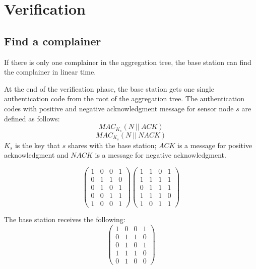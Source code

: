 \chapter{Verification}

\section{Find a complainer}

	If there is only one complainer in the aggregation tree, the base station can find the complainer in linear time.
	
	At the end of the verification phase, the base station gets one single authentication code from the root of the aggregation tree.
	The authentication codes with positive and negative acknowledgment message for sensor node $s$ are defined as follows:
	\begin{equation}
		MAC_{K_{s}}(N\ ||\ ACK)
	\end{equation}
	\begin{equation}
		MAC_{K_{s}}(N\ ||\ NACK)
	\end{equation}
	$K_{s}$ is the key that $s$ shares with the base station;
	$ACK$ is a message for positive acknowledgment and
	$NACK$ is a message for negative acknowledgment.

	\[ 
		\left( 
			\begin{array}{cccc}
				1 & 0 & 0 & 1 \\ 
				0 & 1 & 1 & 0 \\
				0 & 1 & 0 & 1 \\
				0 & 0 & 1 & 1 \\
				\hline
				1 & 0 & 0 & 1 
			\end{array}
		\right)
		\left( 
			\begin{array}{cccc}
				1 & 1 & 0 & 1 \\ 
				1 & 1 & 1 & 1 \\
				0 & 1 & 1 & 1 \\
				1 & 1 & 1 & 0 \\
				\hline
				1 & 0 & 1 & 1 
			\end{array}
		\right)
	\]

	The base station receives the following:
	\[ 
		\left( 
			\begin{array}{cccc}
				1 & 0 & 0 & 1 \\ 
				0 & 1 & 1 & 0 \\
				0 & 1 & 0 & 1 \\
				1 & 1 & 1 & 0 \\
				\hline
				0 & 1 & 0 & 0 
			\end{array}
		\right)
	\]

